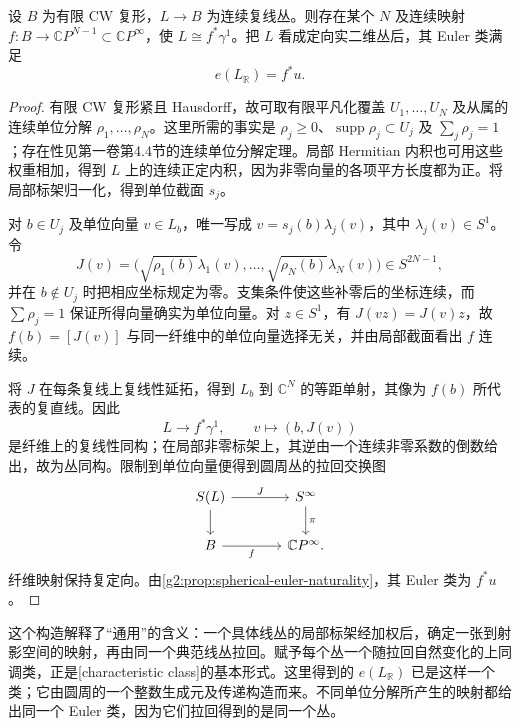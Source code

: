 \begin{proposition}\label{g2:prop:line-bundle-pullback-model}
	设 \(B\) 为有限 CW 复形，\(L\rightarrow B\) 为连续复线丛。则存在某个 \(N\) 及连续映射 \(f:B\rightarrow\mathbb CP^{N-1}\subset\mathbb CP^\infty\)，使 \(L\cong f^*\gamma^1\)。把 \(L\) 看成定向实二维丛后，其 Euler 类满足
	\[
		e(L_{\mathbb R})=f^*u.
	\]
\end{proposition}
\begin{proof}
	有限 CW 复形紧且 Hausdorff，故可取有限平凡化覆盖 \(U_1,\ldots,U_N\) 及从属的连续单位分解 \(\rho_1,\ldots,\rho_N\)。这里所需的事实是 \(\rho_j\ge0\)、\(\operatorname{supp}\rho_j\subset U_j\) 及 \(\sum_j\rho_j=1\)；存在性见第一卷第4.4节的连续单位分解定理。局部 Hermitian 内积也可用这些权重相加，得到 \(L\) 上的连续正定内积，因为非零向量的各项平方长度都为正。将局部标架归一化，得到单位截面 \(s_j\)。

	对 \(b\in U_j\) 及单位向量 \(v\in L_b\)，唯一写成 \(v=s_j(b)\lambda_j(v)\)，其中 \(\lambda_j(v)\in S^1\)。令
	\[
		J(v)=\bigl(\sqrt{\rho_1(b)}\lambda_1(v),\ldots,\sqrt{\rho_N(b)}\lambda_N(v)\bigr)\in S^{2N-1},
	\]
	并在 \(b\notin U_j\) 时把相应坐标规定为零。支集条件使这些补零后的坐标连续，而 \(\sum\rho_j=1\) 保证所得向量确实为单位向量。对 \(z\in S^1\)，有 \(J(vz)=J(v)z\)，故 \(f(b)=[J(v)]\) 与同一纤维中的单位向量选择无关，并由局部截面看出 \(f\) 连续。

	将 \(J\) 在每条复线上复线性延拓，得到 \(L_b\) 到 \(\mathbb C^N\) 的等距单射，其像为 \(f(b)\) 所代表的复直线。因此
	\[
		L\longrightarrow f^*\gamma^1,\qquad v\longmapsto(b,J(v))
	\]
	是纤维上的复线性同构；在局部非零标架上，其逆由一个连续非零系数的倒数给出，故为丛同构。限制到单位向量便得到圆周丛的拉回交换图
	\[
		\begin{tikzcd}[column sep=large]
			S(L)\arrow[r,"J"]\arrow[d] & S^\infty\arrow[d,"\pi"]\\
			B\arrow[r,"f"'] & \mathbb CP^\infty.
		\end{tikzcd}
	\]
	纤维映射保持复定向。由\cref{g2:prop:spherical-euler-naturality}，其 Euler 类为 \(f^*u\)。
\end{proof}

这个构造解释了“通用”的含义：一个具体线丛的局部标架经加权后，确定一张到射影空间的映射，再由同一个典范线丛拉回。赋予每个丛一个随拉回自然变化的上同调类，正是[characteristic class]的基本形式。这里得到的 \(e(L_{\mathbb R})\) 已是这样一个类；它由圆周的一个整数生成元及传递构造而来。不同单位分解所产生的映射都给出同一个 Euler 类，因为它们拉回得到的是同一个丛。

\ProseParagraphBreak

